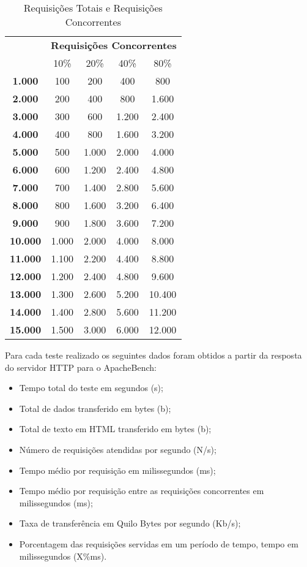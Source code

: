\begin{table}[htb]
	\centering
\ABNTEXfontereduzida
\caption[Requisições Totais e Requisições Concorrentes]{Requisições Totais e Requisições Concorrentes}
\label{tab:requisicoes}
\begin{tabular}{|>{\bfseries}c|c|c|c|c|}
\hline
\multirow{2}{*}{Requisições Totais} & \multicolumn{4}{c|}{\textbf{Requisições 
Concorrentes}} \\ \cline{2-5}
& 10\%      & 20\%  & 40\%  & 80\%  \\ \hline
1.000  & 100   & 200   & 400   & 800   \\ \hline
2.000  & 200   & 400   & 800   & 1.600  \\ \hline
3.000  & 300   & 600   & 1.200 & 2.400  \\ \hline
4.000  & 400   & 800   & 1.600 & 3.200  \\ \hline
5.000  & 500   & 1.000 & 2.000 & 4.000  \\ \hline
6.000  & 600   & 1.200 & 2.400 & 4.800  \\ \hline
7.000  & 700   & 1.400 & 2.800 & 5.600  \\ \hline
8.000  & 800   & 1.600 & 3.200 & 6.400  \\ \hline
9.000  & 900   & 1.800 & 3.600 & 7.200  \\ \hline
10.000 & 1.000 & 2.000 & 4.000 & 8.000  \\ \hline
11.000 & 1.100 & 2.200 & 4.400 & 8.800  \\ \hline
12.000 & 1.200 & 2.400 & 4.800 & 9.600  \\ \hline
13.000 & 1.300 & 2.600 & 5.200 & 10.400 \\ \hline
14.000 & 1.400 & 2.800 & 5.600 & 11.200 \\ \hline
15.000 & 1.500 & 3.000 & 6.000 & 12.000 \\ \hline
\end{tabular}
\end{table}
Para cada teste realizado os seguintes dados foram obtidos a partir da resposta do servidor HTTP para o ApacheBench:
\begin{itemize}
	\item Tempo total do teste em segundos (s);
	\item Total de dados transferido em bytes (b);
	\item Total de texto em HTML transferido em bytes (b);
	\item Número de requisições atendidas por segundo (N/s);
	\item Tempo médio por requisição em milissegundos (ms);
	\item Tempo médio por requisição entre as requisições concorrentes em milissegundos (ms);
	\item Taxa de transferência em Quilo Bytes por segundo (Kb/s);
	\item Porcentagem das requisições servidas em um período de tempo, tempo em milissegundos (X\%ms).
\end{itemize}



